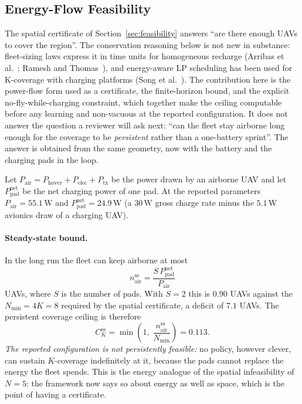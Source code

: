 \documentclass[conference]{IEEEtran}
\begin{document}
\subsection{Energy-Flow Feasibility}
\label{sec:energyflow}

The spatial certificate of Section~\ref{sec:feasibility} answers ``are there
enough UAVs to cover the region''.  The conservation reasoning below is
not new in substance: fleet-sizing laws express it in time units for
homogeneous recharge (Arribas et al.~\cite{arribas2023}; Ramesh and
Thomas~\cite{ramesh2026}), and energy-aware LP scheduling has been used
for K-coverage with charging platforms (Song et al.~\cite{song2024}).
The contribution here is the power-flow form used as a certificate, the
finite-horizon bound, and the explicit no-fly-while-charging constraint,
which together make the ceiling computable before any learning and
non-vacuous at the reported configuration.  It does not answer the question a
reviewer will ask next: ``can the fleet stay airborne long enough for the
coverage to be \emph{persistent} rather than a one-battery sprint''.  The
answer is obtained from the same geometry, now with the battery and the
charging pads in the loop.

Let $P_{\mathrm{air}} = P_{\mathrm{hover}} + P_{\mathrm{elec}} + P_{\mathrm{tx}}$
be the power drawn by an airborne UAV and let $P_{\mathrm{pad}}^{\mathrm{net}}$
be the net charging power of one pad.  At the reported parameters
$P_{\mathrm{air}} = 55.1\,\mathrm{W}$ and $P_{\mathrm{pad}}^{\mathrm{net}}
= 24.9\,\mathrm{W}$ (a $30\,\mathrm{W}$ gross charge rate minus the
$5.1\,\mathrm{W}$ avionics draw of a charging UAV).

\paragraph{Steady-state bound.}  In the long run the fleet can keep airborne
at most
\[
n_{\mathrm{air}}^{\mathrm{ss}}
= \frac{S\,P_{\mathrm{pad}}^{\mathrm{net}}}{P_{\mathrm{air}}}
\]
UAVs, where $S$ is the number of pads.  With $S=2$ this is
$0.90$ UAVs against the $N_{\min}=4K=8$ required by the spatial
certificate, a deficit of $7.1$ UAVs.  The persistent coverage ceiling is
therefore
\[
C_K^{\mathrm{ss}} = \min\!\left(1,\;\frac{n_{\mathrm{air}}^{\mathrm{ss}}}{N_{\min}}\right)
= 0.113 .
\]
\emph{The reported configuration is not persistently feasible:} no policy,
however clever, can sustain $K$-coverage indefinitely at it, because the
pads cannot replace the energy the fleet spends.  This is the energy
analogue of the spatial infeasibility of $N=5$: the framework now says so
about energy as well as space, which is the point of having a certificate.
\end{document}
